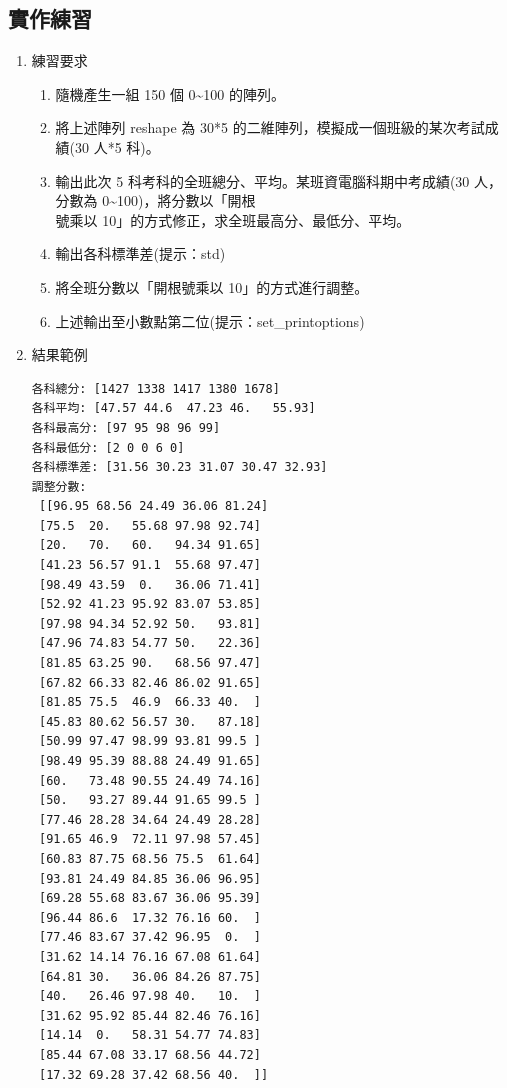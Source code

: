 \documentclass[a4paper,12pt]{article}
\begin{document}
\subsection{實作練習}
\label{sec:org4dfc599}
\begin{enumerate}
\item 練習要求
\label{sec:org128c3f6}
\begin{enumerate}
\item 隨機產生一組 150 個 0\textasciitilde{}100 的陣列。\\
\item 將上述陣列 reshape 為 30*5 的二維陣列，模擬成一個班級的某次考試成績(30 人*5 科)。\\
\item 輸出此次 5 科考科的全班總分、平均。某班資電腦科期中考成績(30 人，分數為 0\textasciitilde{}100)，將分數以「開根\\
號乘以 10」的方式修正，求全班最高分、最低分、平均。\\
\item 輸出各科標準差(提示：std)\\
\item 將全班分數以「開根號乘以 10」的方式進行調整。\\
\item 上述輸出至小數點第二位(提示：set\_printoptions)\\
\end{enumerate}
\item 結果範例
\label{sec:org7622395}
\begin{verbatim}
各科總分: [1427 1338 1417 1380 1678]
各科平均: [47.57 44.6  47.23 46.   55.93]
各科最高分: [97 95 98 96 99]
各科最低分: [2 0 0 6 0]
各科標準差: [31.56 30.23 31.07 30.47 32.93]
調整分數:
 [[96.95 68.56 24.49 36.06 81.24]
 [75.5  20.   55.68 97.98 92.74]
 [20.   70.   60.   94.34 91.65]
 [41.23 56.57 91.1  55.68 97.47]
 [98.49 43.59  0.   36.06 71.41]
 [52.92 41.23 95.92 83.07 53.85]
 [97.98 94.34 52.92 50.   93.81]
 [47.96 74.83 54.77 50.   22.36]
 [81.85 63.25 90.   68.56 97.47]
 [67.82 66.33 82.46 86.02 91.65]
 [81.85 75.5  46.9  66.33 40.  ]
 [45.83 80.62 56.57 30.   87.18]
 [50.99 97.47 98.99 93.81 99.5 ]
 [98.49 95.39 88.88 24.49 91.65]
 [60.   73.48 90.55 24.49 74.16]
 [50.   93.27 89.44 91.65 99.5 ]
 [77.46 28.28 34.64 24.49 28.28]
 [91.65 46.9  72.11 97.98 57.45]
 [60.83 87.75 68.56 75.5  61.64]
 [93.81 24.49 84.85 36.06 96.95]
 [69.28 55.68 83.67 36.06 95.39]
 [96.44 86.6  17.32 76.16 60.  ]
 [77.46 83.67 37.42 96.95  0.  ]
 [31.62 14.14 76.16 67.08 61.64]
 [64.81 30.   36.06 84.26 87.75]
 [40.   26.46 97.98 40.   10.  ]
 [31.62 95.92 85.44 82.46 76.16]
 [14.14  0.   58.31 54.77 74.83]
 [85.44 67.08 33.17 68.56 44.72]
 [17.32 69.28 37.42 68.56 40.  ]]
\end{verbatim}

\newpage
\end{enumerate}
\end{document}
